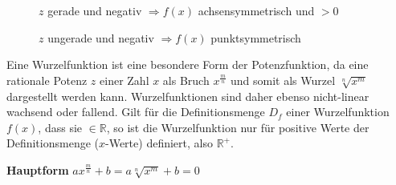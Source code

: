 \begin{figure}[h!]
\begin{floatrow}
{
		} {\caption*{$z$ gerade und negativ $\Rightarrow f(x)$ achsensymmetrisch und $> 0$}}

		\ffigbox
		{
		} {\caption*{$z$ ungerade und negativ $\Rightarrow f(x)$ punktsymmetrisch}}
	\end{floatrow}
\end{figure}

\pagebreak


Eine Wurzelfunktion ist eine besondere Form der Potenzfunktion, da eine rationale Potenz $z$ einer Zahl $x$ als Bruch $x^{\frac{m}{n}}$ und somit als Wurzel $\sqrt[n]{x^m}$ dargestellt werden kann. Wurzelfunktionen sind daher ebenso nicht-linear wachsend oder fallend. Gilt f\"{u}r die Definitionsmenge $D_{f}$ einer Wurzelfunktion $f(x)$, dass sie $\in \mathbb{R}$, so ist die Wurzelfunktion nur f\"{u}r positive Werte der Definitionsmenge ($x$-Werte) definiert, also $\mathbb{R^+}$.

\textbf{Hauptform}  $ax^{\frac{m}{n}} + b = a\sqrt[n]{x^m} + b = 0$

